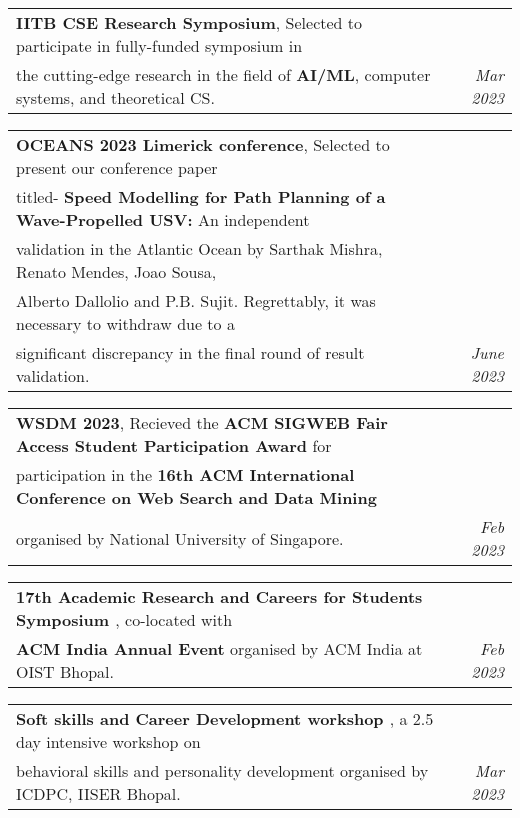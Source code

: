 \documentclass[a4paper,11pt]{article}
\makeatletter
\newcommand{\resumePOR}[3]{
\vspace{0.5mm}\item
    \begin{tabular*}{0.97\textwidth}[t]{l@{\extracolsep{\fill}}r}
        \textbf{#1}, \hspace{0.3mm}#2 & \textit{\small{#3}} 
    \end{tabular*}
    \vspace{-2mm}
}
\makeatother
\begin{document}
    
    \resumePOR{IITB CSE Research Symposium} %
    {Selected to participate in fully-funded symposium in \\the cutting-edge research in the field of \textbf{AI/ML}, computer systems, and theoretical CS.} %
    {Mar 2023} %
    
    \resumePOR{OCEANS 2023 Limerick conference} %
    {Selected to present our conference paper \\ titled- \textbf{Speed Modelling for Path Planning of a Wave-Propelled USV:} An independent \\validation in the Atlantic Ocean by Sarthak Mishra, Renato Mendes, Joao Sousa, \\Alberto Dallolio and P.B. Sujit. Regrettably, it was necessary to withdraw due to a \\significant discrepancy in the final round of result validation.}%
    {June 2023} %
    
    \resumePOR{WSDM 2023} %
    {Recieved the \textbf{ACM SIGWEB Fair Access Student Participation Award} for \\ participation in the \textbf{16th ACM International Conference on Web Search and Data Mining} \\ organised by National University of Singapore.} %
    {Feb 2023} %
    
    \resumePOR{17th Academic Research and Careers for Students Symposium \href{https://drive.google.com/file/d/1fGxtl493hVgFFttQA-xtD2-bYf9KBpXN/view?usp=sharing}{\footnotesize \faIcon{external-link-alt}}} %
    {\textnormal{co-located with} \\ \textbf{ACM India Annual Event} organised by ACM India at OIST Bhopal.} %
    {Feb 2023} %
    
    \resumePOR{Soft skills and Career Development workshop \href{https://drive.google.com/file/d/1QU1xaKHtkA27EPc2FdgE4_J931uG89aO/view?usp=sharing}{\footnotesize \faIcon{external-link-alt}}} %
    {a 2.5 day intensive workshop on \\ behavioral skills and personality development organised by ICDPC, IISER Bhopal.} %
    {Mar 2023} %
\end{document}
